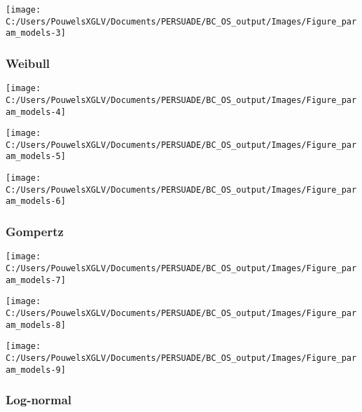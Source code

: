 \documentclass[
]{article}
\begin{document}
\begin{flushleft}\texttt{[image: C:/Users/PouwelsXGLV/Documents/PERSUADE/BC\_OS\_output/Images/Figure\_param\_models-3]} \end{flushleft}

\clearpage

\subsubsection{Weibull}\label{weibull}

\begin{flushleft}\texttt{[image: C:/Users/PouwelsXGLV/Documents/PERSUADE/BC\_OS\_output/Images/Figure\_param\_models-4]} \end{flushleft}

\begin{flushleft}\texttt{[image: C:/Users/PouwelsXGLV/Documents/PERSUADE/BC\_OS\_output/Images/Figure\_param\_models-5]} \end{flushleft}

\begin{flushleft}\texttt{[image: C:/Users/PouwelsXGLV/Documents/PERSUADE/BC\_OS\_output/Images/Figure\_param\_models-6]} \end{flushleft}

\clearpage

\subsubsection{Gompertz}\label{gompertz}

\begin{flushleft}\texttt{[image: C:/Users/PouwelsXGLV/Documents/PERSUADE/BC\_OS\_output/Images/Figure\_param\_models-7]} \end{flushleft}

\begin{flushleft}\texttt{[image: C:/Users/PouwelsXGLV/Documents/PERSUADE/BC\_OS\_output/Images/Figure\_param\_models-8]} \end{flushleft}

\begin{flushleft}\texttt{[image: C:/Users/PouwelsXGLV/Documents/PERSUADE/BC\_OS\_output/Images/Figure\_param\_models-9]} \end{flushleft}

\clearpage

\subsubsection{Log-normal}\label{log-normal}
\end{document}

